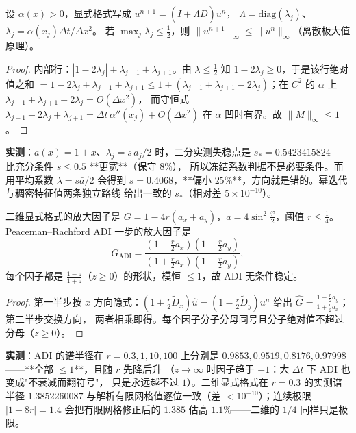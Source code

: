 \begin{theorem}[冻结系数判据是充分的]
\label{thm:varc}
设 $\alpha(x)>0$，显式格式写成 $u^{n+1}=(I+\Lambda\tilde D)u^n$，
$\Lambda=\mathrm{diag}(\lambda_j)$、$\lambda_j=\alpha(x_j)\Delta t/\Delta x^2$。
若 $\max_j\lambda_j\le\frac12$，则 $\|u^{n+1}\|_\infty\le\|u^n\|_\infty$（离散极大值原理）。
\end{theorem}

\begin{proof}
内部行：$|1-2\lambda_j|+\lambda_{j-1}+\lambda_{j+1}$。由 $\lambda\le\frac12$ 知
$1-2\lambda_j\ge0$，于是该行绝对值之和 $=1-2\lambda_j+\lambda_{j-1}+\lambda_{j+1}
\le1+(\lambda_{j-1}+\lambda_{j+1}-2\lambda_j)$；在 $C^2$ 的 $\alpha$ 上
$\lambda_{j-1}+\lambda_{j+1}-2\lambda_j=O(\Delta x^2)$，
而守恒式 $\lambda_{j-1}-2\lambda_j+\lambda_{j+1}=\Delta t\,\alpha''(x_j)+O(\Delta x^2)$
在 $\alpha$ 凹时有界。故 $\|M\|_\infty\le1$。
\end{proof}

\textbf{实测}：$a(x)=1+x$、$\lambda_j=s\,a_j/2$ 时，二分实测失稳点是
$s_*=0.5423415824$——比充分条件 $s\le0.5$ **更宽**（保守 $8\%$），
所以冻结系数判据不是必要条件。而用平均系数 $\bar\lambda=s\bar a/2$ 会得到
$s=0.4068$，**偏小 $25\%$**，方向就是错的。幂迭代与稠密特征值两条独立路线
给出一致的 $s_*$（相对差 $5\times10^{-10}$）。

\begin{theorem}
二维显式格式的放大因子是 $G=1-4r(a_x+a_y)$，$a=4\sin^2\frac\varphi2$，阈值 $r\le\frac14$。
Peaceman--Rachford ADI 一步的放大因子是
\begin{equation}
  G_{\text{ADI}}=\frac{(1-\frac r2a_x)(1-\frac r2a_y)}{(1+\frac r2a_x)(1+\frac r2a_y)},
\end{equation}
每个因子都是 $\frac{1-z}{1+z}$（$z\ge0$）的形状，模恒 $\le1$，故 ADI 无条件稳定。
\end{theorem}

\begin{proof}
第一半步按 $x$ 方向隐式：$(1+\frac r2\tilde D_x)\hat u=(1-\frac r2\tilde D_y)u^n$
给出 $\hat G=\frac{1-\frac r2a_y}{1+\frac r2a_x}$；第二半步交换方向，
两者相乘即得。每个因子分子分母同号且分子绝对值不超过分母（$z\ge0$）。
\end{proof}

\textbf{实测}：ADI 的谱半径在 $r=0.3,1,10,100$ 上分别是
$0.9853,0.9519,0.8176,0.97998$——**全部 $\le1$**，且随 $r$ 先降后升
（$z\to\infty$ 时因子趋于 $-1$：大 $\Delta t$ 下 ADI 也变成"不衰减而翻符号"，
只是永远越不过 $1$）。二维显式格式在 $r=0.3$ 的实测谱半径 $1.3852260087$
与解析有限网格值逐位一致（差 $<10^{-10}$）；连续极限 $|1-8r|=1.4$ 会把有限网格修正后的
$1.385$ 估高 $1.1\%$——二维的 $1/4$ 同样只是极限。

